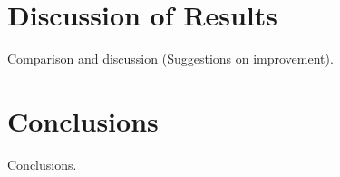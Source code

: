 \section{Discussion of Results}
Comparison and discussion (Suggestions on improvement).

\lipsum

\section{Conclusions}
Conclusions.

\lipsum